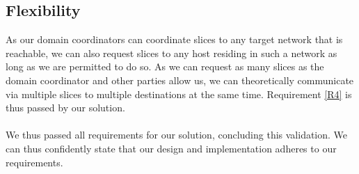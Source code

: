 \subsection{Flexibility}
As our domain coordinators can coordinate slices to any target network that is reachable, we can also request slices to any host residing in such a network as long as we are permitted to do so. As we can request as many slices as the domain coordinator and other parties allow us, we can theoretically communicate via multiple slices to multiple destinations at the same time. Requirement \ref{R4} is thus passed by our solution.

\paragraph{} We thus passed all requirements for our solution, concluding this validation. We can thus confidently state that our design and implementation adheres to our requirements.
